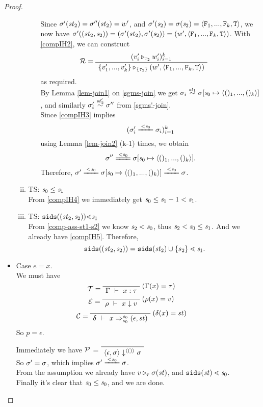 \begin{proof}
\begin{itemize}
\begin{enumerate}[(i)]
\begin{itemize}
	Since $\sigma'(\mathit{st}_2) = \sigma''(\mathit{st}_2) = w'$, and $\sgm'(\s_2) = \sgm(\s_2) = \stwo$,
	we now have $\sgm'((\st_2,\s_2)) = (\sgm'(\st_2),\sgm'(\s_2)) = (w',\stwo)$. 
	With \eqref{compIH2}, we can construct
	$$\MR = 
	\PT{
		\AC{(\ValRep{v'_i}{\tau_2}{w'_i})^k_{i=1}}
		\UC{\ValRep{\Seqk{v'}}{\tseq{\tau_2}}{(w',\stwo)}}
	}$$ as required. \\

	By Lemma \ref{lem-join1} on \eqref{sgms-join} we get $\sgm_i \~{\st_1} \sgmsz$, and similarly $\sigma'_i \stackrel{\mathit{st}_2'}{\sim} \sigma''$ from \eqref{sgms'-join}. \\
	
	Since \eqref{compIH3} implies $$(\sgm'_i \ConEq{\s_0} \sgm_i)^k_{i=1}$$
	using Lemma \ref{lem-join2} (k-1) times, we obtain 
	$$\sgm'' \ConEq{\s_0} \sgmsz.$$
	Therefore, $\sgm' \ConEq{\s_0} \sgmsz \ConEq{\s_0} \sgm$.\\

	\end{itemize}

	\item TS: $\mathit{s}_0 \le \mathit{s}_1$ \\
	From \eqref{compIH4} we immediately get $\mathit{s}_0 \le \mathit{s}_1 -1 < \mathit{s}_1$.\\
	
	\item TS: $\sids{(\st_2,\s_2)} {\.<} \s_1$  \\
	From \eqref{comp-ass-st1-s2} we know $\mathit{s}_2 < \mathit{s}_0$, thus $ \mathit{s}_2 < \mathit{s}_0 \le \mathit{s}_1$. 
	And we already have \eqref{compIH5}. Therefore,
	$$\sids{(\st_2,\s_2)} = \sids{\st_2} \cup \{s_2\} \.< \s_1.$$
	
	\end{enumerate}

 \item Case $e = x$.\\
 We must have 
 $$\MT = \PT{
 	\AxiomC{}
 	\RiLa{(\Gam(x) = \tau)}
 	\UC{\Type{\Gam}{x}{\tau}}
 }$$
 $$ \ME = 
 \PT{
 	\AxiomC{}
 	\RiLa{(\rho(x)=v)}
 	\UC{\Eval{\rho}{x}{v}}
 }$$
 $$ \MC = 
 \PT{\AC{}
 	\RiLa{(\del(x)= \st)}
 	\UC{\Trans{\del}{x}{\s_0}{\s_0}{\sfun{\epsilon}{\st}}}
 }
 $$
 So $p= \epsilon$. 
 
 Immediately we have $\mathcal{P}$ =
 $\PT{\Axiom{\seval{\epsilon}{\sgm}{\vunit}{\sgm}}}$\\
 So $\sigma' = \sigma$, which implies $\sgm'  \ConEq{\s_0} \sgm$.\\
 From the assumption we already have $v \triangleright_{\tau} \sigma(\mathit{st})$,
 and $\sids{\st} \.< \s_0$. \\
 Finally it's clear that $\mathit{s}_0 \le \mathit{s}_0$, and we are done.
 

\end{itemize}
\end{proof}
